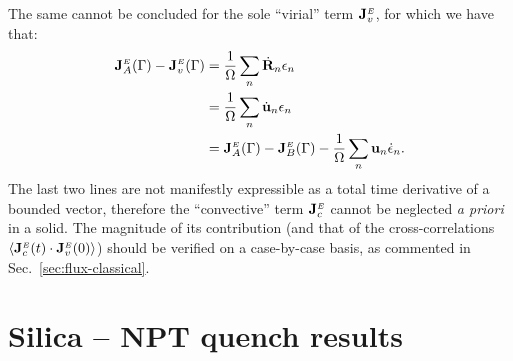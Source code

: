 The same cannot be concluded for the sole ``virial'' term $\mathbf{J}_v^{\scriptscriptstyle E}$, for which we have that:
\begin{align}
    \mathbf{J}_A^{\scriptscriptstyle E}({\mathrm\Gamma}) - \mathbf{J}_v^{\scriptscriptstyle E}({\mathrm\Gamma}) 
        &= \frac{1}{\Omega} \sum_n \dot{\mathbf{R}}_n \epsilon_n  \nonumber\\
        &= \frac{1}{\Omega} \sum_n \dot{\mathbf{u}}_n \epsilon_n  \nonumber\\
        &= \mathbf{J}_A^{\scriptscriptstyle E}({\mathrm\Gamma}) - \mathbf{J}_B^{\scriptscriptstyle E}({\mathrm\Gamma}) - \frac{1}{\Omega} \sum_n \mathbf{u}_n \dot{\epsilon}_n .
\end{align}
The last two lines are not manifestly expressible as a total time derivative of a bounded vector, therefore the ``convective'' term $\mathbf{J}_c^{\scriptscriptstyle E}$ cannot be neglected \emph{a priori} in a solid. The magnitude of its contribution (and that of the cross-correlations $\langle\mathbf{J}_c^{\scriptscriptstyle E}(t)\cdot \mathbf{J}_v^{\scriptscriptstyle E}(0)\rangle$) should be verified on a case-by-case basis, as commented in Sec.~\ref{sec:flux-classical}.


\chapter{Silica -- NPT quench results}  \label{ch:appendix-npt-results}

